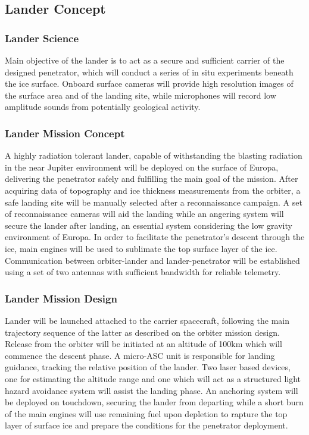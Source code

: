 \subsection{Lander Concept}

\subsubsection{Lander Science}

Main objective of the lander is to act as a secure and sufficient carrier of the designed penetrator, which will conduct a series of in situ experiments beneath the ice surface. Onboard surface cameras will provide high resolution images of the surface area and of the landing site, while microphones will record low amplitude sounds from potentially geological activity.

\subsubsection{Lander Mission Concept}
A highly radiation tolerant lander, capable of withstanding the blasting radiation in the near Jupiter environment will be deployed on the surface of Europa, delivering the penetrator safely and fulfilling the main goal of the mission. 
After acquiring data of topography and ice thickness measurements from the orbiter, a safe landing site will be manually selected after a reconnaissance campaign. A set of reconnaissance cameras will aid the landing while an angering system will secure the lander after landing, an essential system considering the low gravity environment of Europa. In order to facilitate the penetrator’s descent through the ice, main engines will be used to sublimate the top surface layer of the ice. Communication between orbiter-lander and lander-penetrator will be established using a set of two antennas with sufficient bandwidth for reliable telemetry.

\subsubsection{Lander Mission Design}

Lander will be launched attached to the carrier spacecraft, following the main trajectory sequence of the latter as described on the orbiter mission design.  
Release from the orbiter will be initiated at an altitude of 100km which will commence the descent phase. A micro-ASC unit is responsible for landing guidance, tracking the relative position of the lander. Two laser based devices, one for estimating the altitude range and one which will act as a structured light hazard avoidance system will assist the landing phase. An anchoring system will be deployed on touchdown, securing the lander from departing while a short burn of the main engines will use remaining fuel upon depletion to rapture the top layer of surface ice and prepare the conditions for the penetrator deployment. 

